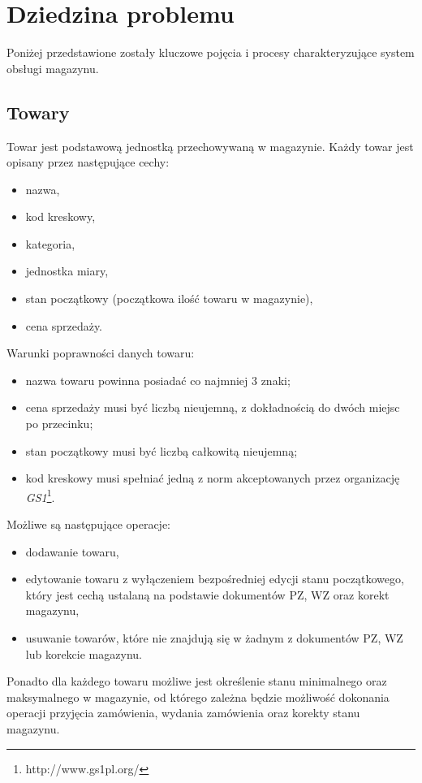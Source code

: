 \section{Dziedzina problemu}
\label{dziedzina-problemu}
Poniżej przedstawione zostały kluczowe pojęcia i procesy charakteryzujące system obsługi magazynu.

\subsection{Towary}
Towar jest podstawową jednostką przechowywaną w magazynie. Każdy towar jest opisany przez następujące cechy:
\begin{itemize}
	\item nazwa,
	\item kod kreskowy,
	\item kategoria,
	\item jednostka miary,
	\item stan początkowy (początkowa ilość towaru w magazynie),
	\item cena sprzedaży.
\end{itemize}

Warunki poprawności danych towaru:
\begin{itemize}
    \item nazwa towaru powinna posiadać co najmniej 3 znaki; 
    \item cena sprzedaży musi być liczbą nieujemną, z dokładnością do dwóch miejsc po przecinku;
    \item stan początkowy musi być liczbą całkowitą nieujemną;
    \item kod kreskowy musi spełniać jedną z norm akceptowanych przez organizację \emph{GS1}\footnote{http://www.gs1pl.org/}.
\end{itemize}

Możliwe są następujące operacje:
\begin{itemize}
	\item dodawanie towaru,
	\item edytowanie towaru z wyłączeniem bezpośredniej edycji stanu początkowego, który jest cechą ustalaną na podstawie dokumentów PZ, WZ oraz korekt magazynu,
	\item usuwanie towarów, które nie znajdują się w żadnym z dokumentów PZ, WZ lub korekcie magazynu.
\end{itemize}

Ponadto dla każdego towaru możliwe jest określenie stanu minimalnego oraz maksymalnego w magazynie, od którego zależna będzie możliwość dokonania operacji przyjęcia zamówienia, wydania zamówienia oraz korekty stanu magazynu.

